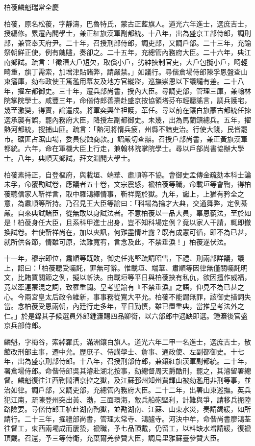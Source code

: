 
\begin{pinyinscope}
柏葰麟魁瑞常全慶

柏葰，原名松葰，字靜濤，巴魯特氏，蒙古正藍旗人。道光六年進士，選庶吉士，授編修。累遷內閣學士，兼正紅旗漢軍副都統。十八年，出為盛京工部侍郎，調刑部，兼管奉天府尹。二十年，召授刑部侍郎，調吏部，又調戶部。二十三年，充諭祭朝鮮正使，例有餽贐，奏卻之。二十五年，充總管內務府大臣。二十六年，典江南鄉試。疏言：「徵漕大戶短欠，取償小戶，劣紳挾制官吏，大戶包攬小戶，畸輕畸重，旗丁需索，加增津貼諸弊，請嚴禁。」如議行。尋偕倉場侍郎陳孚恩盤查山東籓庫，劾布政使王篤濫用幕友及地方官縱盜，巡撫崇恩以下議譴有差。二十八年，擢左都御史。三十年，遷兵部尚書，授內大臣。尋調吏部，管理三庫，兼翰林院掌院學士。咸豐三年，命偕侍郎善燾赴盛京按協領塔芬布輕聽謠言，調兵護宅，幾至激變，得實，論遣戍。將軍奕興坐袒護，革任。尋以前在鑲白旗蒙古都統任揀選承襲有誤，罷內務府大臣，降授左副都御史。未幾，出為馬蘭鎮總兵。五年，擢熱河都統，搜捕山匪。疏言：「熱河將惰兵疲，州縣不諳吏治。行使大錢，民皆罷市。礦匪占踞山場，委員侵蝕商款。」詔嚴切查辦。召授戶部尚書，兼正黃旗漢軍都統。六年，命在軍機大臣上行走，兼翰林院掌院學士。尋以戶部尚書協辦大學士。八年，典順天鄉試，拜文淵閣大學士。

柏葰素持正，自登樞府，與載垣、端華、肅順等不協。會御史孟傳金疏劾本科士論未孚，命覆勘試卷，應議者五十卷，文宗震怒，褫柏葰等職，命載垣等會鞫，得柏葰聽信家人靳祥言，取中羅鴻繹情事，靳祥斃於獄。九年，讞上，上猶有矜全之意，為肅順等所持。乃召見王大臣等諭曰：「科場為掄才大典，交通舞弊，定例綦嚴。自來典試諸臣，從無敢以身試法者。不意柏葰以一品大員，辜恩藐法，至於如是！柏葰身任大臣，且系科甲進士出身，豈不知科場定例？竟以家人干請，輒即撤換試卷。若使靳祥尚在，加以夾訊，何難盡情吐露？既有成憲可循，即不為已甚，就所供各節，情雖可原，法難寬宥，言念及此，不禁垂淚！」柏葰遂伏法。

十一年，穆宗即位，肅順等既敗，御史任兆堅疏請昭雪，下禮、刑兩部詳議，議上，詔曰：「柏葰聽受囑託，罪無可辭。惟載垣、端華、肅順等因律無僅關囑託明文，比賄買關節之例，擬以斬決。由載垣等平日與柏葰挾有私仇，欲因擅作威福，竟以牽連蒙混之詞，致罹重闢。皇考聖諭有『不禁垂淚』之語，仰見不為已甚之心。今兩宮皇太后政令維新，事事務從寬大平允。柏葰不能謂無罪，該御史措詞失當。念柏葰受恩兩朝，內廷行走多年，平日勤慎，雖已置重典，當推皇考法外之仁。」於是錄其子候選員外郎鍾濂賜四品卿銜，以六部郎中遇缺即選。鍾濂後官盛京兵部侍郎。

麟魁，字梅谷，索綽羅氏，滿洲鑲白旗人。道光六年二甲一名進士，選庶吉士，散館改刑部主事，遷中允。歷庶子、侍講學士、詹事、通政使、左副都御史。十七年，出為盛京刑部侍郎。十八年，召授刑部侍郎，兼鑲紅旗漢軍副都統。二十年，署倉場侍郎。命偕侍郎吳其濬赴湖北按事，劾總督周天爵酷刑，罷之，其濬留署總督。麟魁復往江西鞫鬧漕京控之獄，及江蘇邳州知州賈輝山被劾濫用非刑等事，並治如律。調戶部，又調吏部，充總管內務府大臣。二十二年，出署山東巡撫。英兵犯江南，疏陳登州突出黃、渤，三面環海，敵兵船砲堅利，計難與爭，請移兵扼陸路險要。尋偕侍郎王植赴湖南鞫獄，並勘湖南、江蘇、山東水災，奏請蠲緩，如所請行。二十三年，擢禮部尚書，管理太常寺、鴻臚寺。河決中牟，命偕尚書廖鴻荃往督工，東西兩壩成而屢蟄，褫職，予七品頂戴，仍留工，以料缺水增請緩，復褫頂戴。召還，予三等侍衛，充葉爾羌參贊大臣，調烏里雅蘇臺參贊大臣。


\end{pinyinscope}
